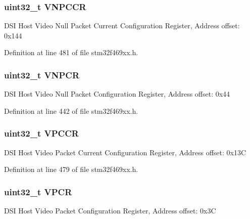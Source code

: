 \subsubsection[{\texorpdfstring{V\+N\+P\+C\+CR}{VNPCCR}}]{ uint32\+\_\+t V\+N\+P\+C\+CR}\hypertarget{struct_d_s_i___type_def_a494e0b2abf2c5a06dab01d08c65af55a}{}\label{struct_d_s_i___type_def_a494e0b2abf2c5a06dab01d08c65af55a}
D\+SI Host Video Null Packet Current Configuration Register, Address offset\+: 0x144 

Definition at line 481 of file stm32f469xx.\+h.

\subsubsection[{\texorpdfstring{V\+N\+P\+CR}{VNPCR}}]{ uint32\+\_\+t V\+N\+P\+CR}\hypertarget{struct_d_s_i___type_def_ac5764e1f1815411d35a474f01066f196}{}\label{struct_d_s_i___type_def_ac5764e1f1815411d35a474f01066f196}
D\+SI Host Video Null Packet Configuration Register, Address offset\+: 0x44 

Definition at line 442 of file stm32f469xx.\+h.

\subsubsection[{\texorpdfstring{V\+P\+C\+CR}{VPCCR}}]{ uint32\+\_\+t V\+P\+C\+CR}\hypertarget{struct_d_s_i___type_def_ab4720f16225bc17b3dba7d8caf773807}{}\label{struct_d_s_i___type_def_ab4720f16225bc17b3dba7d8caf773807}
D\+SI Host Video Packet Current Configuration Register, Address offset\+: 0x13C 

Definition at line 479 of file stm32f469xx.\+h.

\subsubsection[{\texorpdfstring{V\+P\+CR}{VPCR}}]{ uint32\+\_\+t V\+P\+CR}\hypertarget{struct_d_s_i___type_def_abcf10f676fb04e2f4ef0ee2f6ee8dcdd}{}\label{struct_d_s_i___type_def_abcf10f676fb04e2f4ef0ee2f6ee8dcdd}
D\+SI Host Video Packet Configuration Register, Address offset\+: 0x3C 

